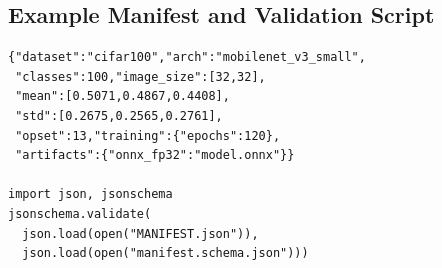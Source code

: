\documentclass{article}
\begin{document}
\subsection{Example Manifest and Validation Script}
\begin{verbatim}
{"dataset":"cifar100","arch":"mobilenet_v3_small",
 "classes":100,"image_size":[32,32],
 "mean":[0.5071,0.4867,0.4408],
 "std":[0.2675,0.2565,0.2761],
 "opset":13,"training":{"epochs":120},
 "artifacts":{"onnx_fp32":"model.onnx"}}

import json, jsonschema
jsonschema.validate(
  json.load(open("MANIFEST.json")),
  json.load(open("manifest.schema.json")))
\end{verbatim}
\end{document}
